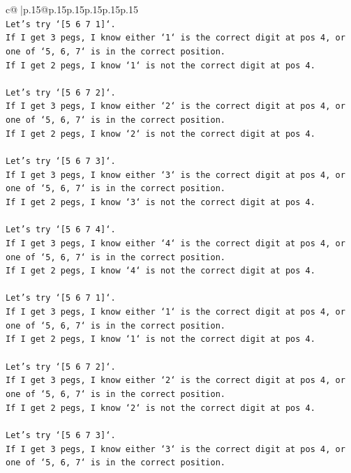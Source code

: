\documentclass{article}
\begin{document}
{\begin{supertabular}{c@{$\;$}|p{.15\linewidth}@{}p{.15\linewidth}p{.15\linewidth}p{.15\linewidth}p{.15\linewidth}p{.15\linewidth}}
{{{\\ 
\texttt{Let's try `{[}5 6 7 1{]}`.} \\
\texttt{If I get 3 pegs, I know either `1` is the correct digit at pos 4, or one of `5, 6, 7` is in the correct position.} \\
\texttt{If I get 2 pegs, I know `1` is not the correct digit at pos 4.} \\
\\ 
\texttt{Let's try `{[}5 6 7 2{]}`.} \\
\texttt{If I get 3 pegs, I know either `2` is the correct digit at pos 4, or one of `5, 6, 7` is in the correct position.} \\
\texttt{If I get 2 pegs, I know `2` is not the correct digit at pos 4.} \\
\\ 
\texttt{Let's try `{[}5 6 7 3{]}`.} \\
\texttt{If I get 3 pegs, I know either `3` is the correct digit at pos 4, or one of `5, 6, 7` is in the correct position.} \\
\texttt{If I get 2 pegs, I know `3` is not the correct digit at pos 4.} \\
\\ 
\texttt{Let's try `{[}5 6 7 4{]}`.} \\
\texttt{If I get 3 pegs, I know either `4` is the correct digit at pos 4, or one of `5, 6, 7` is in the correct position.} \\
\texttt{If I get 2 pegs, I know `4` is not the correct digit at pos 4.} \\
\\ 
\texttt{Let's try `{[}5 6 7 1{]}`.} \\
\texttt{If I get 3 pegs, I know either `1` is the correct digit at pos 4, or one of `5, 6, 7` is in the correct position.} \\
\texttt{If I get 2 pegs, I know `1` is not the correct digit at pos 4.} \\
\\ 
\texttt{Let's try `{[}5 6 7 2{]}`.} \\
\texttt{If I get 3 pegs, I know either `2` is the correct digit at pos 4, or one of `5, 6, 7` is in the correct position.} \\
\texttt{If I get 2 pegs, I know `2` is not the correct digit at pos 4.} \\
\\ 
\texttt{Let's try `{[}5 6 7 3{]}`.} \\
\texttt{If I get 3 pegs, I know either `3` is the correct digit at pos 4, or one of `5, 6, 7` is in the correct position.} \\
}}}
\end{supertabular}}
\end{document}
